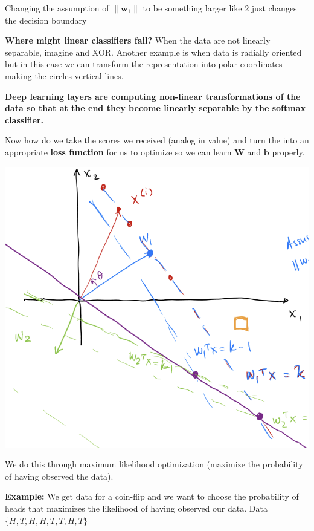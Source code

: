 \documentclass[twocolumn, letter, 10pt, landscape]{article}
\newcommand{\mb}{\mathbf}
\newcommand{\tb}{\textbf}
\begin{document}
\begin{minipage}{2.6in}
Changing the assumption of $\|\mb{w}_1\|$ to be something larger like $2$ just changes the decision boundary

\tb{Where might linear classifiers fail?} When the data are not linearly separable, imagine and XOR. Another example is when data is radially oriented but in this case we can transform the representation into polar coordinates making the circles vertical lines.

\tb{Deep learning layers are computing non-linear transformations of the data so that at the end they become linearly separable by the softmax classifier.}

Now how do we take the scores we received (analog in value) and turn the into an appropriate \tb{loss function} for us to optimize so we can learn $\mb{W}$ and $\mb{b}$ properly.
\end{minipage}
\begin{minipage}{2.6in}
\includegraphics[scale=0.5, trim=0 0 0 0]{lec4_graph.png}
\end{minipage}

We do this through maximum likelihood optimization (maximize the probability of having observed the data).

\tb{Example:} We get data for a coin-flip and we want to choose the probability of heads that maximizes the likelihood of having observed our data. Data = $\{H, T, H, H, T, T, H, T\}$
\end{document}
